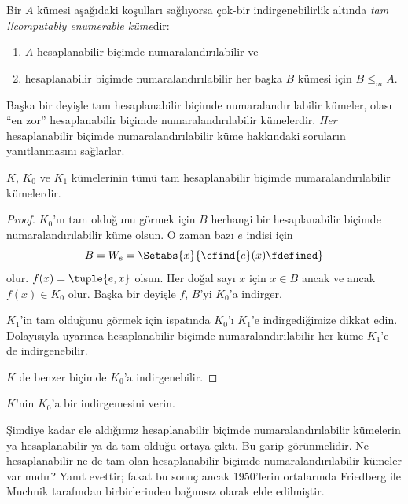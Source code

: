 \documentclass[../../../include/open-logic-section]{subfiles}
\begin{document}

\begin{defn}
Bir $A$ kümesi aşağıdaki koşulları sağlıyorsa çok-bir indirgenebilirlik
altında \emph{tam !!{computably enumerable} küme}dir:
\begin{enumerate}
\item $A$ hesaplanabilir biçimde numaralandırılabilir ve
\item hesaplanabilir biçimde numaralandırılabilir her başka $B$ kümesi için
  $B\leq_m A$.
\end{enumerate}
\end{defn}

Başka bir deyişle tam hesaplanabilir biçimde numaralandırılabilir kümeler,
olası ``en zor'' hesaplanabilir biçimde numaralandırılabilir kümelerdir.
\emph{Her} hesaplanabilir biçimde numaralandırılabilir küme hakkındaki
soruların yanıtlanmasını sağlarlar.

\begin{thm}
$K$, $K_0$ ve $K_1$ kümelerinin tümü tam hesaplanabilir biçimde
numaralandırılabilir kümelerdir.
\end{thm}

\begin{proof}
$K_0$'ın tam olduğunu görmek için $B$ herhangi bir hesaplanabilir biçimde
numaralandırılabilir küme olsun. O zaman bazı $e$ indisi için
\[
  B=W_e=\Setabs{x}{\cfind{e}(x)\fdefined}
\]
olur. $f(x)=\tuple{e,x}$ olsun. Her doğal sayı $x$ için $x\in B$ ancak ve
ancak $f(x)\in K_0$ olur. Başka bir deyişle $f$, $B$'yi $K_0$'a indirger.

$K_1$'in tam olduğunu görmek için  ispatında $K_0$'ı
$K_1$'e indirgediğimize dikkat edin. Dolayısıyla
 uyarınca hesaplanabilir biçimde
numaralandırılabilir her küme $K_1$'e de indirgenebilir.

$K$ de benzer biçimde $K_0$'a indirgenebilir.
\end{proof}

\begin{prob}
$K$'nin $K_0$'a bir indirgemesini verin.
\end{prob}

\begin{digress}
Şimdiye kadar ele aldığımız hesaplanabilir biçimde numaralandırılabilir
kümelerin ya hesaplanabilir ya da tam olduğu ortaya çıktı. Bu garip
görünmelidir. Ne hesaplanabilir ne de tam olan hesaplanabilir biçimde
numaralandırılabilir kümeler var mıdır? Yanıt evettir; fakat bu sonuç ancak
1950'lerin ortalarında Friedberg ile Muchnik tarafından birbirlerinden
bağımsız olarak elde edilmiştir.
\end{digress}
\end{document}
